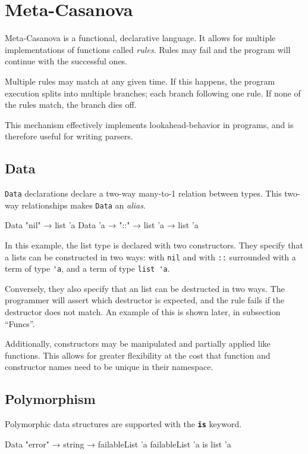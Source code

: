 \section{Meta-Casanova}
  Meta-Casanova is a functional, declarative language.
  It allows for multiple implementations of functions called \textit{rules}.
  Rules may fail and the program will continue with the successful ones.

  Multiple rules may match at any given time.
  If this happens, the program execution splits into multiple branches; each branch following one rule.
  If none of the rules match, the branch dies off. 

  This mechanism effectively implements lookahead-behavior in programs, and is therefore useful for writing parsers.
  
  \subsection{Data}
  \texttt{Data} declarations declare a two-way \mbox{many-to-1} relation between types.
  This two-way relationships makes \texttt{Data} an \textit{alias}.

  \begin{code}
  Data "nil" → list 'a
  Data 'a → "::" → list 'a → list 'a
  \end{code}

  In this example, the list type is declared with two constructors.
  They specify that a lists can be constructed in two ways: with \verb|nil| and with \verb|::| surrounded with a term of type \verb|'a|, and a term of type \verb|list 'a|.

  Conversely, they also specify that an list can be destructed in two ways.
  The programmer will assert which destructor is expected, and the rule fails if the destructor does not match.
  An example of this is shown later, in subsection ``Funcs''.

  Additionally, constructors may be manipulated and partially applied like functions.
  This allows for greater flexibility at the cost that function and constructor names need to be unique in their namespace.

  \subsection{Polymorphism}
  Polymorphic data structures are supported with the \textbf{\texttt{is}} keyword.

  \begin{code}
  Data "error" → string → failableList 'a
  failableList 'a is list 'a
  \end{code}

